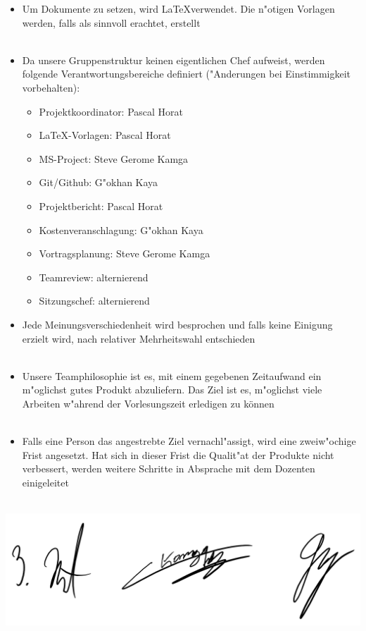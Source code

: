\documentclass[12pt]{article}
\begin{document}
\begin{itemize}
\item Um Dokumente zu setzen, wird \LaTeX verwendet. Die n"otigen Vorlagen werden, falls als sinnvoll erachtet, erstellt\\\\
\end{itemize}

\begin{itemize}
\item Da unsere Gruppenstruktur keinen eigentlichen Chef aufweist, werden folgende Verantwortungsbereiche definiert ("Anderungen bei Einstimmigkeit vorbehalten):\\


\begin{itemize}
\item Projektkoordinator: Pascal Horat
\item LaTeX-Vorlagen: Pascal Horat
\item MS-Project: Steve Gerome Kamga
\item Git/Github: G"okhan Kaya  
\item Projektbericht: Pascal Horat
\item Kostenveranschlagung: G"okhan Kaya
\item Vortragsplanung: Steve Gerome Kamga
\item Teamreview: alternierend
\item Sitzungschef: alternierend
\end{itemize}
\end{itemize}

\begin{itemize}
\item Jede Meinungsverschiedenheit wird besprochen und falls keine Einigung erzielt wird, nach relativer Mehrheitswahl entschieden\\\\
\end{itemize}

\begin{itemize}
\item Unsere Teamphilosophie ist es, mit einem gegebenen Zeitaufwand ein m"oglichst gutes Produkt abzuliefern. Das Ziel ist es, m"oglichst viele Arbeiten w"ahrend der Vorlesungszeit erledigen zu können\\\\
\end{itemize}

\begin{itemize}
\item Falls eine Person das angestrebte Ziel vernachl"assigt, wird eine zweiw"ochige Frist angesetzt. Hat sich in dieser Frist die Qualit"at der Produkte nicht verbessert, werden weitere Schritte in Absprache mit dem Dozenten einigeleitet\\\\
\end{itemize}

\begin{center}
\includegraphics[scale=0.5]{unterschriften}\\
\end{center}
 
\end{document}
